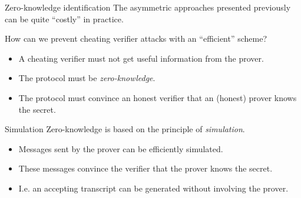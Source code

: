 \begin{frame}{Zero-knowledge identification}
  The asymmetric approaches presented previously can be quite \enquote{costly} in practice.

  \vspace*{1em}

  \pause
  How can we prevent cheating verifier attacks with an \enquote{efficient} scheme?
  \begin{itemize}[<+(1)->]
    \item A cheating verifier must not get useful information from the prover.
    \item The protocol must be \emph{zero-knowledge}.
    \item The protocol must convince an honest verifier that an (honest) prover knows the secret.
  \end{itemize}
\end{frame}

\begin{frame}{Simulation}
  Zero-knowledge is based on the principle of \emph{simulation}.
  \begin{itemize}[<+(1)->]
    \item Messages sent by the prover can be efficiently simulated.
    \item These messages convince the verifier that the prover knows the secret.
    \item I.e. an accepting transcript can be generated without involving the prover.
  \end{itemize}
\end{frame}

